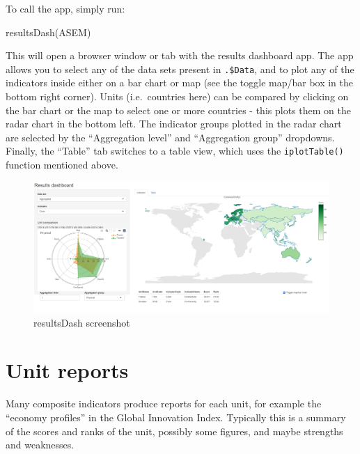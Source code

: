 \documentclass[
]{book}
\newenvironment{Shaded}{\begin{snugshade}}{\end{snugshade}}
\newcommand{\FunctionTok}[1]{\textcolor[rgb]{0.00,0.00,0.00}{#1}}
\newcommand{\NormalTok}[1]{#1}
\begin{document}
To call the app, simply run:

\begin{Shaded}
\begin{Highlighting}[]
\FunctionTok{resultsDash}\NormalTok{(ASEM)}
\end{Highlighting}
\end{Shaded}

This will open a browser window or tab with the results dashboard app. The app allows you to select any of the data sets present in \texttt{.\$Data}, and to plot any of the indicators inside either on a bar chart or map (see the toggle map/bar box in the bottom right corner). Units (i.e.~countries here) can be compared by clicking on the bar chart or the map to select one or more countries - this plots them on the radar chart in the bottom left. The indicator groups plotted in the radar chart are selected by the ``Aggregation level'' and ``Aggregation group'' dropdowns. Finally, the ``Table'' tab switches to a table view, which uses the \texttt{iplotTable()} function mentioned above.

\begin{figure}

{\centering \includegraphics[width=1\linewidth]{images/resultsDash_screenshot} 

}

\caption{resultsDash screenshot}\label{fig:unnamed-chunk-51}
\end{figure}

\hypertarget{unit-reports}{%
\section{Unit reports}\label{unit-reports}}

Many composite indicators produce reports for each unit, for example the ``economy profiles'' in the Global Innovation Index. Typically this is a summary of the scores and ranks of the unit, possibly some figures, and maybe strengths and weaknesses.
\end{document}
